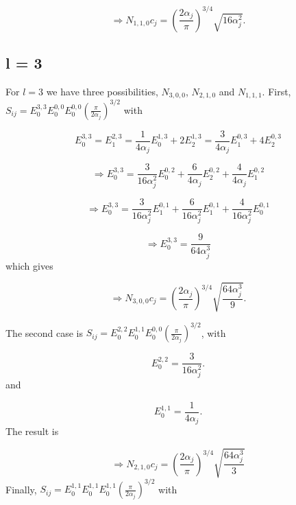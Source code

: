 \documentclass[a4paper,norsk,11pt,twoside]{report}
\begin{document}
\begin{equation}
\Rightarrow N_{1,1,0} c_j = \left( \frac{2\alpha_j}{\pi} \right)^{3/4} \sqrt{16 \alpha_j^2} .
\end{equation}

\subsection{l = 3}
For $l = 3$ we have three possibilities, $N_{3,0,0}$, $N_{2,1,0}$ and $N_{1,1,1}$. 
First,$S_{ij} = E_0^{3,3} E_0^{0,0} E_0^{0,0} \left(\frac{\pi}{2\alpha_j}\right)^{3/2}$
with

\begin{equation}
E_0^{3,3} = E_1^{2,3} = \frac{1}{4\alpha_j} E_0^{1,3} + 2 E_2^{1,3} = \frac{3}{4\alpha_j} E_1^{0,3} + 4 E_2^{0,3} 
\end{equation}

\begin{equation}
\Rightarrow E_0^{3,3} = \frac{3}{16 \alpha_j^2} E_0^{0,2} + \frac{6}{4 \alpha_j} E_2^{0,2} + \frac{4}{4\alpha_j} E_1^{0,2} 
\end{equation}

\begin{equation}
\Rightarrow E_0^{3,3} = \frac{3}{16\alpha_j^2} E_1^{0,1} + \frac{6}{16 \alpha_j^2} E_1^{0,1} + \frac{4}{16 \alpha_j^2} E_0^{0,1} 
\end{equation}

\begin{equation}
\Rightarrow E_0^{3,3} = \frac{9}{64 \alpha_j^3} 
\end{equation}
which gives 

\begin{equation}
\Rightarrow N_{3,0,0} c_j = \left( \frac{2\alpha_j}{\pi} \right)^{3/4} \sqrt{\frac{64 \alpha_j^3}{9}} .
\end{equation}

The second case is $S_{ij} = E_0^{2,2} E_0^{1,1} E_0^{0,0} \left(\frac{\pi}{2\alpha_j}\right)^{3/2}$, with

\begin{equation}
E_{0}^{2,2} = \frac{3}{16 \alpha_j^2}  .
\end{equation}
and 

\begin{equation}
E_0^{1,1} = \frac{1}{4\alpha_j} .
\end{equation}
The result is

\begin{equation}
\Rightarrow N_{2,1,0} c_j = \left( \frac{2\alpha_j}{\pi} \right)^{3/4} \sqrt{\frac{64 \alpha_j^3}{3}} 
\end{equation}
Finally, $S_{ij} = E_0^{1,1} E_0^{1,1} E_0^{1,1} \left(\frac{\pi}{2\alpha_j}\right)^{3/2}$ with
\end{document}
